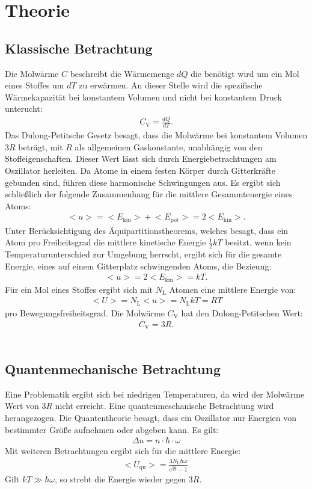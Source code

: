 \section{Theorie}
\label{sec:Theorie}
\subsection{Klassische Betrachtung}
Die Molwärme $C$ beschreibt die Wärmemenge $dQ$
die benötigt wird um ein Mol eines Stoffes um $dT$ zu erwärmen.
An dieser Stelle wird die spezifische Wärmekapazität bei konstantem Volumen und nicht bei
konstantem Druck unterucht:
\begin{align}
  C_{\mathrm{V}}=\frac{dQ}{dT}.
\end{align}
Das Dulong-Petitsche Gesetz besagt, dass die Molwärme bei konstantem Volumen
$3R$ beträgt, mit $R$ als allgemeinen Gaskonstante, unabhängig von den Stoffeigenschaften.
Dieser Wert lässt sich durch Energiebetrachtungen am Oszillator herleiten. Da Atome in einem
festen Körper durch Gitterkräfte gebunden sind, führen diese harmonische Schwingungen
aus. Es ergibt sich schließlich der folgende Zusammenhang für die mittlere Gesammtenergie
eines Atoms:
\begin{align}
  \bigl<u\bigr>=\bigl<E_{\mathrm{kin}}\bigr>+\bigl<E_{\mathrm{pot}}\bigr>=2\bigl<E_{\mathrm{kin}}\bigr>.
\end{align}
Unter Berücksichtigung des Äquipartitionstheorems, welches besagt, dass ein Atom
pro Freiheitsgrad die mittlere kinetische Energie $\frac{1}{2}kT$ besitzt,
wenn kein Temperaturunterschied zur Umgebung herrscht, ergibt sich für
die gesamte Energie, eines auf einem Gitterplatz schwingenden Atoms, die Bezieung:
\begin{align}
  \bigl<u\bigr>=2\bigl<E_{\mathrm{kin}}\bigr>=kT.
\end{align}
Für ein Mol eines Stoffes ergibt sich mit $N_\mathrm{L}$ Atomen eine mittlere Energie von:
\begin{align}
  \bigl<U\bigr>=N_{\mathrm{L}}\bigl<u\bigr>=N_{\mathrm{L}}kT=RT
\end{align}
pro Bewegungsfreiheitsgrad.
Die Molwärme $C_{\mathrm{V}}$ hat den Dulong-Petitschen Wert:
\begin{align}
  C_{\mathrm{V}}=3R.
\end{align}\\
\subsection{Quantenmechanische Betrachtung}
Eine Problematik ergibt sich bei niedrigen Temperaturen, da wird der Molwärme Wert
von $3R$ nicht erreicht. Eine quantenmeschanische Betrachtung wird herangezogen.
Die Quantentheorie besagt, dass ein Oszillator nur Energien von bestimmter Größe
aufnehmen oder abgeben kann.
Es gilt:
\begin{align}
  \Delta u=n\cdot\hbar\cdot\omega
\end{align}
Mit weiteren Betrachtungen ergibt sich für die mittlere Energie:
\begin{align}
\bigl<U_{\mathrm{qu}}\bigr>=\frac{3N_{\mathrm{L}}\hbar\omega}{e^{\frac{\hbar\omega}{kT}}-1}.
\end{align}
Gilt $kT \gg \hbar\omega$, so strebt die Energie wieder gegen $3R$.
